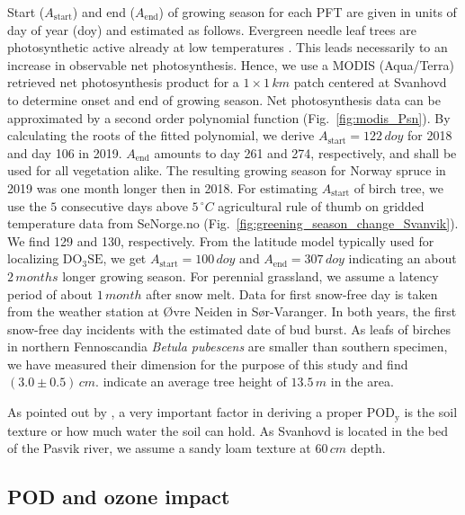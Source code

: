 \documentclass[bg, manuscript]{copernicus}
\begin{document}
Start ($A_\text{start}$) and end ($A_\text{end}$) of growing season for each PFT are given in units of day of year (doy) and estimated as follows. Evergreen needle leaf trees are photosynthetic active already at low temperatures \citep{TB:Kolari2007}. This leads necessarily to an increase in observable net photosynthesis. Hence, we use a MODIS (Aqua/Terra) retrieved net photosynthesis product for a $1\times 1\,\unit{km}$ patch centered at Svanhovd to determine onset and end of growing season. Net photosynthesis data can be approximated by a second order polynomial function (Fig.~\ref{fig:modis_Psn}). By calculating the roots of the fitted polynomial, we derive $A_\text{start} = 122\,\unit{doy}$ for 2018 and day 106 in 2019. $A_\text{end}$ amounts to day 261 and 274, respectively, and shall be used for all vegetation alike. The resulting growing season for Norway spruce in 2019 was one month longer then in 2018. For estimating $A_\text{start}$ of birch tree, we use the $5$ consecutive days above $5\,\unit{^\circ C}$ agricultural rule of thumb on gridded temperature data from SeNorge.no (Fig.~\ref{fig:greening_season_change_Svanvik}). We find 129 and 130, respectively. From the latitude model typically used for localizing $\mathrm{DO_3SE}$, we get $A_\mathrm{start} = 100\,\unit{doy}$ and $A_\mathrm{end} = 307\,\unit{doy}$ indicating an about $2\,\unit{months}$ longer growing season. For perennial grassland, we assume a latency period of about $1\,\unit{month}$ after snow melt. Data for first snow-free day is taken from the weather station at Øvre Neiden in Sør-Varanger. In both years, the first snow-free day incidents with the estimated date of bud burst. As leafs of birches in northern Fennoscandia \emph{Betula pubescens} are smaller than southern specimen, we have measured their dimension for the purpose of this study and find $(3.0\pm 0.5)\,\unit{cm}$. \citet[][p.~52]{NINA2004} indicate an average tree height of $13.5\,\unit{m}$ in the area.

As pointed out by \citet{ACP:Bueker2012}, a very important factor in deriving a proper $\mathrm{POD_y}$ is the soil texture or how much water the soil can hold. As Svanhovd is located in the bed of the Pasvik river, we assume a sandy loam texture at $60\,\unit{cm}$ depth.\\



\subsection{POD and ozone impact}
\end{document}
